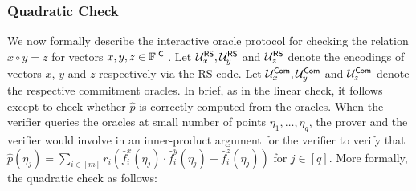 \subsubsection{Quadratic Check}\label{subsec:quadcheck2D}
We now formally describe the interactive oracle protocol for checking the relation $x\circ y = z$ for vectors $x,y,z\in \mathbb{F}^{\mathsf{|C|}}$. Let $\mathcal{U}^{\mathsf{RS}}_x, \mathcal{U}^{\mathsf{RS}}_y$ and $\mathcal{U}^{\mathsf{RS}}_z$ denote the encodings of vectors $x$, $y$ and $z$ respectively via the RS code. Let $\mathcal{U}^{\mathsf{Com}}_x,\mathcal{U}^{\mathsf{Com}}_y$ and $\mathcal{U}^{\mathsf{Com}}_z$ denote the respective commitment oracles. In brief, as in the linear check, it follows \cite{ligero} except to check whether $\hat{p}$ is correctly computed from the oracles. When the verifier queries the oracles at small number of points $\eta_1,\ldots,\eta_q$, the prover and the verifier would involve in an inner-product argument for the verifier to verify that $\hat{p}(\eta_j)=\sum_{i\in [m]}r_i(\hat{f}^x_i(\eta_j) \cdot \hat{f}^y_i(\eta_j)-\hat{f}^z_i(\eta_j))$ for $j\in [q]$.
More formally, the quadratic check as follows:


